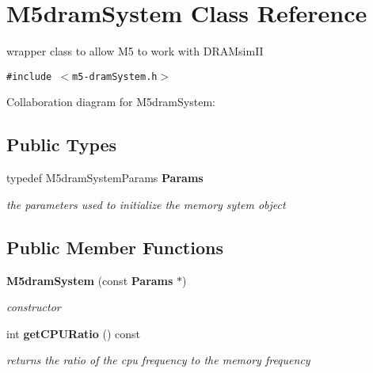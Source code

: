 \section{M5dramSystem Class Reference}
\label{class_m5dram_system}
wrapper class to allow M5 to work with DRAMsimII  


{\tt \#include $<$m5-dramSystem.h$>$}

Collaboration diagram for M5dramSystem:\subsection*{Public Types}
\begin{CompactItemize}
\item 
typedef M5dramSystemParams {\bf Params}\label{class_m5dram_system_bc049789b7ba009ac06888952383d456}

\begin{CompactList}\small\item\em the parameters used to initialize the memory sytem object \item\end{CompactList}\end{CompactItemize}
\subsection*{Public Member Functions}
\begin{CompactItemize}
\item 
{\bf M5dramSystem} (const {\bf Params} $\ast$)\label{class_m5dram_system_84fc057ba92f2b4259bb6e48dfda6e67}

\begin{CompactList}\small\item\em constructor \item\end{CompactList}\item 
int {\bf getCPURatio} () const \label{class_m5dram_system_1525d7f1a5251189661baf1ba2ae67c6}

\begin{CompactList}\small\item\em returns the ratio of the cpu frequency to the memory frequency \item\end{CompactList}\end{CompactItemize}
